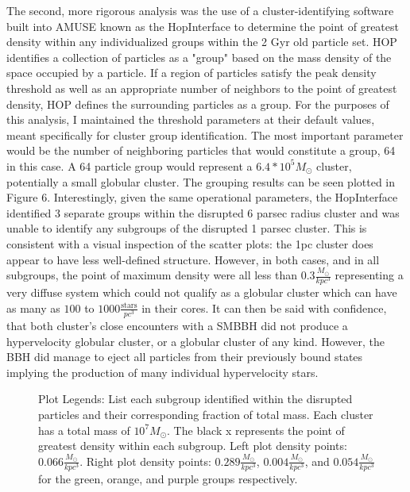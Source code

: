 \documentclass{aastex62}
\begin{document}
The second, more rigorous analysis was the use of a cluster-identifying software built into AMUSE known as the HopInterface \citep{eisen98} to determine the point of greatest density within any individualized groups within the 2 Gyr old particle set. HOP identifies a collection of particles as a "group" based on the mass density of the space occupied by a particle. If a region of particles satisfy the peak density threshold as well as an appropriate number of neighbors to the point of greatest density, HOP defines the surrounding particles as a group. For the purposes of this analysis, I maintained the threshold parameters at their default values, meant specifically for cluster group identification. The most important parameter would be the number of neighboring particles that would constitute a group, 64 in this case. A 64 particle group would represent a $6.4 * 10^5 M_{\odot}$ cluster, potentially a small globular cluster. The grouping results can be seen plotted in Figure 6. Interestingly, given the same operational parameters, the HopInterface identified 3 separate groups within the disrupted 6 parsec radius cluster and was unable to identify any subgroups of the disrupted 1 parsec cluster. This is consistent with a visual inspection of the scatter plots: the 1pc cluster does appear to have less well-defined structure. However, in both cases, and in all subgroups, the point of maximum density were all less than $0.3 \frac{M_{\odot}}{kpc^3}$ representing a very diffuse system which could not qualify as a globular cluster which can have as many as $100$ to $1000 \frac{\text{stars}}{pc^3}$ in their cores. It can then be said with confidence, that both cluster's close encounters with a SMBBH did not produce a hypervelocity globular cluster, or a globular cluster of any kind. However, the BBH did manage to eject all particles from their previously bound states implying the production of many individual hypervelocity stars.

\begin{figure}
\centering
\caption{Plot Legends: List each subgroup identified within the disrupted particles and their corresponding fraction of total mass. Each cluster has a total mass of $10^7 M_{\odot}$. The black x represents the point of greatest density within each subgroup. Left plot density points: $0.066 \frac{M_{\odot}}{kpc^3}$. Right plot density points: $0.289 \frac{M_{\odot}}{kpc^3}$, $0.004 \frac{M_{\odot}}{kpc^3}$, and $0.054 \frac{M_{\odot}}{kpc^3}$ for the green, orange, and purple groups respectively.\label{fig7}}
\end{figure}
\end{document}
